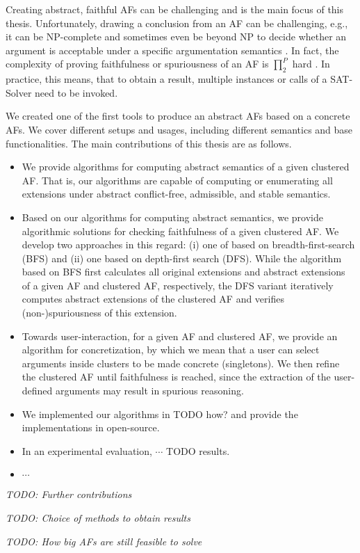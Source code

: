 Creating abstract, faithful AFs can be challenging and is the main focus of this thesis. Unfortunately, drawing a conclusion from an AF can be challenging, e.g., it can be NP-complete and sometimes even be beyond NP to decide whether an argument is acceptable under a specific argumentation semantics \cite{DBLP:journals/ai/DvorakGRW23}. In fact, the complexity of proving faithfulness or spuriousness of an AF is $\prod_2^P$ hard \cite{DBLP:conf/kr/SaribaturW21}. In practice, this means, that to obtain a result, multiple instances or calls of a SAT-Solver need to be invoked.

We created one of the first tools to produce an abstract AFs based on a concrete AFs. We cover different setups and usages, including different semantics and base functionalities. The main contributions of this thesis are as follows.

\begin{itemize}
    \item We provide algorithms for computing abstract semantics of a given clustered AF. That is, our algorithms are capable of computing or enumerating all extensions under abstract conflict-free, admissible, and stable semantics.

    \item Based on our algorithms for computing abstract semantics, we provide algorithmic solutions for checking faithfulness of a given clustered AF. We develop two approaches in this regard: (i) one of based on breadth-first-search (BFS) and (ii) one based on depth-first search (DFS). While the algorithm based on BFS first calculates all original extensions and abstract extensions of a given AF and clustered AF, respectively, the DFS variant iteratively computes abstract extensions of the clustered AF and verifies (non-)spuriousness of this extension.

    \item Towards user-interaction, for a given AF and clustered AF, we provide an algorithm for concretization, by which we mean that a user can select arguments inside clusters to be made concrete (singletons). We then refine the clustered AF until faithfulness is reached, since the extraction of the user-defined arguments may result in spurious reasoning.
    
    \item We implemented our algorithms in TODO how? and provide the implementations in open-source.
    \item In an experimental evaluation, $\cdots$ TODO results.
    \item $\cdots$
\end{itemize}

\noindent

\textit{TODO: Further contributions}

\textit{TODO: Choice of methods to obtain results}

\textit{TODO: How big AFs are still feasible to solve}
